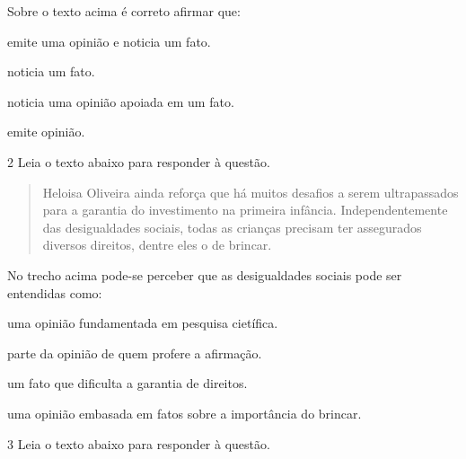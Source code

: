 Sobre o texto acima é correto afirmar que:

\begin{escolha}

  \item emite uma opinião e noticia um fato.

  \item noticia um fato. 

  \item noticia uma opinião apoiada em um fato.

  \item emite opinião. 

\end{escolha}


\num{2} Leia o texto abaixo para responder à questão. 

\begin{quote}

Heloisa Oliveira ainda reforça que há muitos desafios a serem ultrapassados para a garantia do investimento na primeira infância. Independentemente das desigualdades sociais, todas as crianças precisam ter assegurados diversos direitos, dentre eles o de brincar.

\end{quote}


No trecho acima pode-se perceber que as desigualdades sociais pode ser
entendidas como:

\begin{escolha}

  \item uma opinião fundamentada em pesquisa cietífica.
  
  \item parte da opinião de quem profere a afirmação.
  
  \item um fato que dificulta a garantia de direitos.
  
  \item uma opinião embasada em fatos sobre a importância do brincar.

\end{escolha}


\num{3} Leia o texto abaixo para responder à questão.

